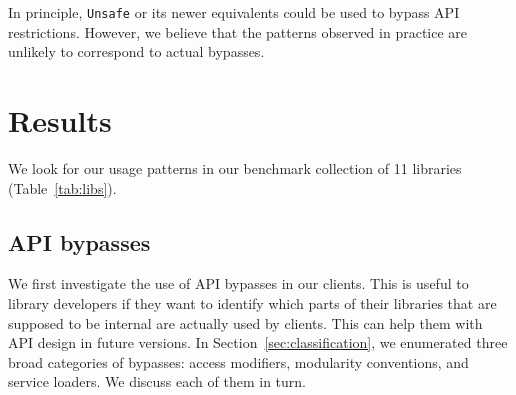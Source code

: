 In principle, \texttt{Unsafe} or its newer equivalents could be used to bypass API restrictions. However, we believe that the patterns observed in practice are unlikely to correspond to actual bypasses.






\section{Results}
\label{sec:results}

We look for our usage patterns in our benchmark collection of 11 libraries (Table~\ref{tab:libs}).

\subsection{API bypasses}
We first investigate the use of API bypasses in our clients. This is useful to library developers if they want to identify which parts of their libraries that are supposed to be internal are actually used by clients. This can help them with API design in future versions. In Section~\ref{sec:classification}, we enumerated three broad categories
of bypasses: access modifiers, modularity conventions, and service loaders. We discuss each of them in turn.


